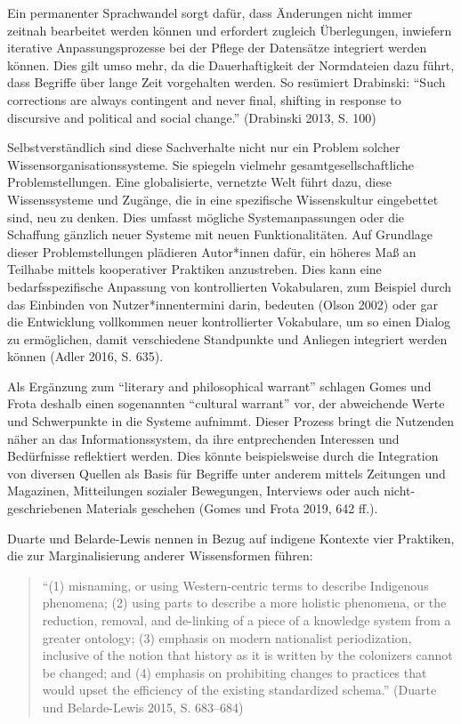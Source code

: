 \documentclass[a4paper,
fontsize=11pt,
oneside,
numbers=noperiodatend,
parskip=half-,
bibliography=totoc,
final
]{scrartcl}
\begin{document}
Ein permanenter Sprachwandel sorgt dafür, dass Änderungen nicht immer
zeitnah bearbeitet werden können und erfordert zugleich Überlegungen,
inwiefern iterative Anpassungsprozesse bei der Pflege der Datensätze
integriert werden können. Dies gilt umso mehr, da die Dauerhaftigkeit
der Normdateien dazu führt, dass Begriffe über lange Zeit vorgehalten
werden. So resümiert Drabinski: \enquote{Such corrections are always
contingent and never final, shifting in response to discursive and
political and social change.} (Drabinski 2013, S. 100)

Selbstverständlich sind diese Sachverhalte nicht nur ein Problem solcher
Wissensorganisationssysteme. Sie spiegeln vielmehr
gesamtgesellschaftliche Problemstellungen. Eine globalisierte, vernetzte
Welt führt dazu, diese Wissenssysteme und Zugänge, die in eine
spezifische Wissenskultur eingebettet sind, neu zu denken. Dies umfasst
mögliche Systemanpassungen oder die Schaffung gänzlich neuer Systeme mit
neuen Funktionalitäten. Auf Grundlage dieser Problemstellungen plädieren
Autor*innen dafür, ein höheres Maß an Teilhabe mittels kooperativer
Praktiken anzustreben. Dies kann eine bedarfsspezifische Anpassung von
kontrollierten Vokabularen, zum Beispiel durch das Einbinden von
Nutzer*innentermini darin, bedeuten (Olson 2002) oder gar die
Entwicklung vollkommen neuer kontrollierter Vokabulare, um so einen
Dialog zu ermöglichen, damit verschiedene Standpunkte und Anliegen
integriert werden können (Adler 2016, S. 635).

Als Ergänzung zum \enquote{literary and philosophical warrant} schlagen
Gomes und Frota deshalb einen sogenannten \enquote{cultural warrant}
vor, der abweichende Werte und Schwerpunkte in die Systeme aufnimmt.
Dieser Prozess bringt die Nutzenden näher an das Informationssystem, da
ihre entprechenden Interessen und Bedürfnisse reflektiert werden. Dies
könnte beispielsweise durch die Integration von diversen Quellen als
Basis für Begriffe unter anderem mittels Zeitungen und Magazinen,
Mitteilungen sozialer Bewegungen, Interviews oder auch
nicht-geschriebenen Materials geschehen (Gomes und Frota 2019, 642 ff.).

Duarte und Belarde-Lewis nennen in Bezug auf indigene Kontexte vier
Praktiken, die zur Marginalisierung anderer Wissensformen führen:

\begin{quote}
\enquote{(1) misnaming, or using Western-centric terms to describe
Indigenous phenomena; (2) using parts to describe a more holistic
phenomena, or the reduction, removal, and de-linking of a piece of a
knowledge system from a greater ontology; (3) emphasis on modern
nationalist periodization, inclusive of the notion that history as it is
written by the colonizers cannot be changed; and (4) emphasis on
prohibiting changes to practices that would upset the efficiency of the
existing standardized schema.} (Duarte und Belarde-Lewis 2015, S.
683--684)
\end{quote}
\end{document}
